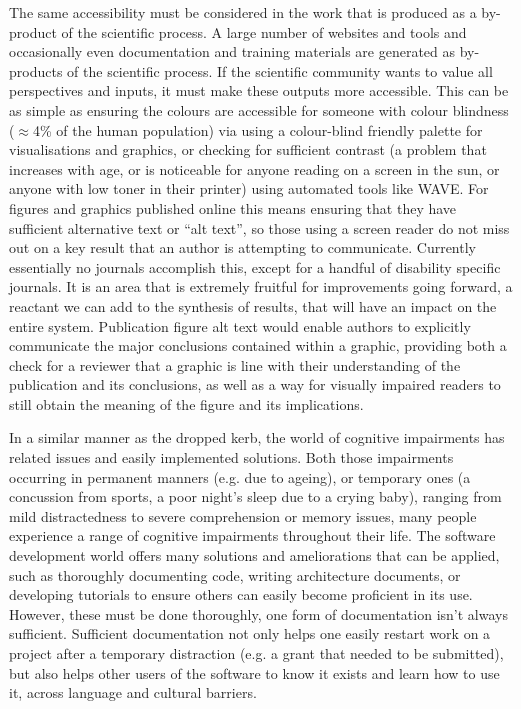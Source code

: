 The same accessibility must be considered in the work that is produced as a by-product of the scientific process. A large number of websites and tools and occasionally even documentation and training materials are generated as by-products of the scientific process. If the scientific community wants to value all perspectives and inputs, it must make these outputs more accessible. This can be as simple as ensuring the colours are accessible for someone with colour blindness ($\approx$4\% of the human population) via using a colour-blind friendly palette for visualisations and graphics, or checking for sufficient contrast (a problem that increases with age, or is noticeable for anyone reading on a screen in the sun, or anyone with low toner in their printer) using automated tools like WAVE\cite{wave}. For figures and graphics published online this means ensuring that they have sufficient alternative text or ``alt text'', so those using a screen reader do not miss out on a key result that an author is attempting to communicate. Currently essentially no journals accomplish this, except for a handful of disability specific journals\cite{Crane_2023}. It is an area that is extremely fruitful for improvements going forward, a reactant we can add to the synthesis of results, that will have an impact on the entire system. Publication figure alt text would enable authors to explicitly communicate the major conclusions contained within a graphic, providing both a check for a reviewer that a graphic is line with their understanding of the publication and its conclusions, as well as a way for visually impaired readers to still obtain the meaning of the figure and its implications.

In a similar manner as the dropped kerb, the world of cognitive impairments has related issues and easily implemented solutions. Both those impairments occurring in permanent manners (e.g. due to ageing), or temporary ones (a concussion from sports, a poor night's sleep due to a crying baby), ranging from mild distractedness to severe comprehension or memory issues, many people experience a range of cognitive impairments throughout their life. The software development world offers many solutions and ameliorations that can be applied, such as thoroughly documenting code, writing architecture documents, or developing tutorials to ensure others can easily become proficient in its use. However, these must be done thoroughly, one form of documentation isn't always sufficient. Sufficient documentation not only helps one easily restart work on a project after a temporary distraction (e.g. a grant that needed to be submitted), but also helps other users of the software to know it exists and learn how to use it, across language and cultural barriers.

